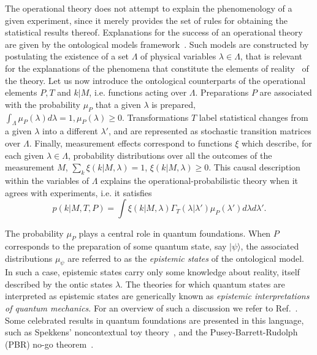 \documentclass[letterpaper,onecolumn,12pt,accepted=2024-01-17]{article}
\begin{document}
The operational theory does not attempt to explain the phenomenology of a given experiment, since it merely provides the set of rules for obtaining the statistical results thereof. Explanations for the success of an operational theory are given by the ontological models framework~\cite{liang2011specker,leifer2014isthequantum}. Such models are constructed by postulating the existence of a set $\Lambda$ of physical variables $\lambda \in \Lambda$, that is relevant for the explanations of the phenomena that constitute the elements of reality~\cite{EinsteinPR35} of the theory. Let us now introduce the ontological counterparts of the operational elements $P, T$ and $k \vert M $, i.e. functions acting over $\Lambda$. Preparations $P$ are associated with the probability $\mu_P$ that a given $\lambda$ is prepared, $\int_\Lambda \mu_P(\lambda)d\lambda = 1, \mu_P(\lambda) \geq 0$. Transformations $T$ label statistical changes from a given $\lambda$ into a different $\lambda'$, and are represented as stochastic transition matrices over $\Lambda$. Finally, measurement effects correspond to functions $\xi$ which describe, for each given $\lambda \in \Lambda$, probability distributions over all the outcomes of the measurement $M$, {$\sum_{k }\xi(k\vert M,\lambda)=1$, $\xi(k\vert M,\lambda) \geq 0$.} This causal description within the variables of $\Lambda$ explains the operational-probabilistic theory when it agrees with experiments, i.e. it satisfies
\begin{equation}
    {p(k \vert M,T,P) = \int \xi(k \vert M,\lambda)\Gamma_T(\lambda \vert \lambda')\mu_P(\lambda') d\lambda d\lambda'.}
\end{equation}

{ The probability $\mu_P$ plays a central role in quantum foundations. When $P$ corresponds to the preparation of some quantum state, say $\vert \psi \rangle$, the associated distributions $\mu_{\psi}$ are referred to as the \textit{epistemic states} of the ontological model. In such a case, epistemic states carry only some knowledge about reality, itself described by the ontic states $\lambda$. The theories for which quantum states are interpreted as epistemic states are generically known as \textit{epistemic interpretations of quantum mechanics}. For an overview of such a discussion we refer to Ref.~\cite{leifer2014isthequantum}. Some celebrated results in quantum foundations are presented in this language, such as Spekkens' noncontextual toy theory~\cite{spekkens2007evidence}, and the Pusey-Barrett-Rudolph (PBR) no-go theorem~\cite{pusey2012onthereality}. }
\end{document}
